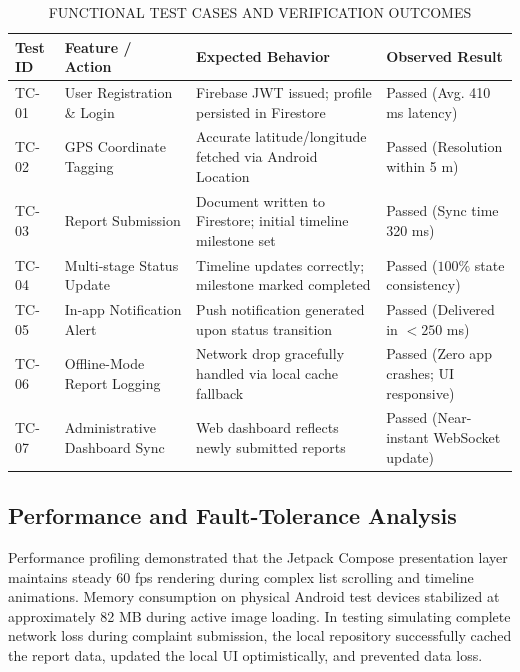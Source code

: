 \documentclass[conference]{IEEEtran}
\renewcommand{\arraystretch}{1.15}
\begin{document}
\begin{table}[H]
\caption{FUNCTIONAL TEST CASES AND VERIFICATION OUTCOMES}
\centering
\scriptsize
\setlength{\tabcolsep}{2.5pt}
\renewcommand{\arraystretch}{1.2}
\begin{tabular}{|p{0.8cm}|p{2.3cm}|p{2.6cm}|p{1.9cm}|}
\hline
\textbf{Test ID} & \textbf{Feature / Action} & \textbf{Expected Behavior} & \textbf{Observed Result} \\
\hline
TC-01 & User Registration \& Login & Firebase JWT issued; profile persisted in Firestore & Passed (Avg. 410 ms latency) \\
\hline
TC-02 & GPS Coordinate Tagging & Accurate latitude/longitude fetched via Android Location & Passed (Resolution within 5 m) \\
\hline
TC-03 & Report Submission & Document written to Firestore; initial timeline milestone set & Passed (Sync time 320 ms) \\
\hline
TC-04 & Multi-stage Status Update & Timeline updates correctly; milestone marked completed & Passed ($100\%$ state consistency) \\
\hline
TC-05 & In-app Notification Alert & Push notification generated upon status transition & Passed (Delivered in $<250$ ms) \\
\hline
TC-06 & Offline-Mode Report Logging & Network drop gracefully handled via local cache fallback & Passed (Zero app crashes; UI responsive) \\
\hline
TC-07 & Administrative Dashboard Sync & Web dashboard reflects newly submitted reports & Passed (Near-instant WebSocket update) \\
\hline
\end{tabular}
\label{tab:testing}
\end{table}

\subsection{Performance and Fault-Tolerance Analysis}
Performance profiling demonstrated that the Jetpack Compose presentation layer maintains steady 60 fps rendering during complex list scrolling and timeline animations. Memory consumption on physical Android test devices stabilized at approximately 82 MB during active image loading. In testing simulating complete network loss during complaint submission, the local repository successfully cached the report data, updated the local UI optimistically, and prevented data loss.
\end{document}
